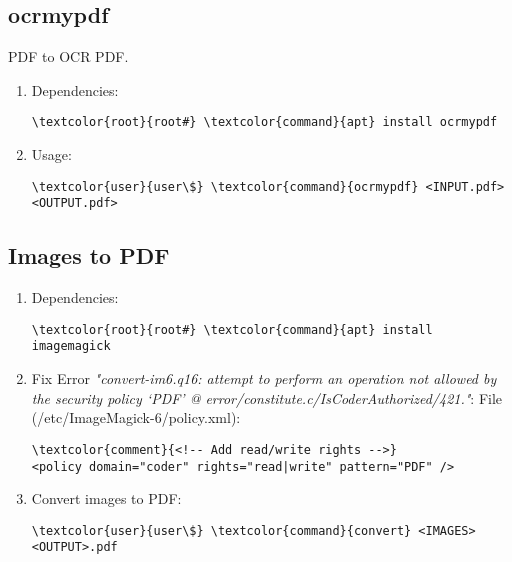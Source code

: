 \documentclass[10pt, a4paper, onecolumn, openany]{book} %
\begin{document}
\subsection{ocrmypdf}
PDF to OCR PDF.
\begin{enumerate}
    \item Dependencies:
\begin{Verbatim}[commandchars=\\\{\}]
\textcolor{root}{root#} \textcolor{command}{apt} install ocrmypdf
\end{Verbatim}
    \item Usage:
\begin{Verbatim}[commandchars=\\\{\}]
\textcolor{user}{user\$} \textcolor{command}{ocrmypdf} <INPUT.pdf> <OUTPUT.pdf>
\end{Verbatim}
\end{enumerate}
\subsection{Images to PDF}
\begin{enumerate}
    \item Dependencies:
\begin{Verbatim}[commandchars=\\\{\}]
\textcolor{root}{root#} \textcolor{command}{apt} install imagemagick
\end{Verbatim}
    \item Fix Error \textit{"convert-im6.q16: attempt to perform an operation not allowed by the security policy `PDF' @ error/constitute.c/IsCoderAuthorized/421."}:
\newline File (\textcolor{file}{/etc/ImageMagick-6/policy.xml}):
\begin{Verbatim}[commandchars=\\\{\}]
\textcolor{comment}{<!-- Add read/write rights -->}
<policy domain="coder" rights="read|write" pattern="PDF" />
\end{Verbatim}
    \item Convert images to PDF:
\begin{Verbatim}[commandchars=\\\{\}]
\textcolor{user}{user\$} \textcolor{command}{convert} <IMAGES> <OUTPUT>.pdf
\end{Verbatim}
\end{enumerate}
\end{document}
